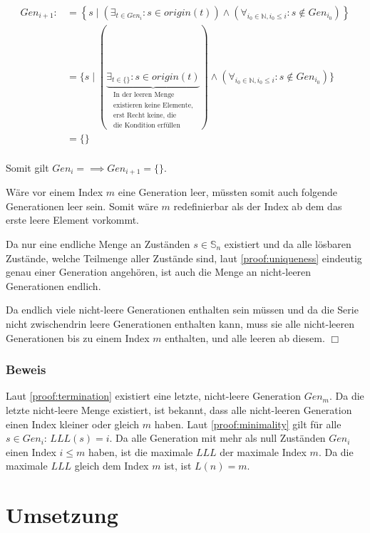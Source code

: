 \documentclass[a4paper,10pt,ngerman]{scrartcl}
\begin{document}
\begin{align*}
    Gen_{i+1} :&= \left\{ s \mid \left(\exists_{t \in Gen_i} : s \in origin(t)\right) \land \left(\forall_{i_0\in\mathbb{N}, i_0 \leq i}: s \notin Gen_{i_0}\right) \right\} \\
    & = \{ s \mid (\underbrace{\exists_{t \in \{\}} : s \in origin(t)}_{\substack{\text{In der leeren Menge}\\\text{existieren keine Elemente,}\\\text{erst Recht keine, die}\\\text{die Kondition erfüllen}}}) \land (\forall_{i_0\in\mathbb{N}, i_0 \leq i}: s \notin Gen_{i_0}) \} \\
    & = \{\} \\
\end{align*}

Somit gilt \(Gen_i = {} \implies Gen_{i+1} = \{\}\).

Wäre vor einem Index \(m\) eine Generation leer, müssten somit auch folgende Generationen leer sein. Somit wäre \(m\) redefinierbar als der Index ab dem das erste leere Element vorkommt.

Da nur eine endliche Menge an Zuständen \(s \in \mathbb{S}_n\) existiert und da alle lösbaren Zustände, welche Teilmenge aller Zustände sind, laut \cref{proof:uniqueness} eindeutig genau einer Generation angehören, ist auch die Menge an nicht-leeren Generationen endlich.

Da endlich viele nicht-leere Generationen enthalten sein müssen und da die Serie nicht zwischendrin leere Generationen enthalten kann, muss sie alle nicht-leeren Generationen bis zu einem Index \(m\) enthalten, und alle leeren ab diesem. \(\Box\)

\subsubsection{Beweis}

Laut \cref{proof:termination} existiert eine letzte, nicht-leere Generation \(Gen_m\).
Da die letzte nicht-leere Menge existiert, ist bekannt, dass alle nicht-leeren Generation einen Index kleiner oder gleich \(m\) haben.
Laut \cref{proof:minimality} gilt für alle \(s \in Gen_i\): \(LLL(s) = i\).
Da alle Generation mit mehr als null Zuständen \(Gen_i\) einen Index \(i \leq m\) haben, ist die maximale \(LLL\) der maximale Index \(m\).
Da die maximale \(LLL\) gleich dem Index \(m\) ist, ist \(L(n) = m\).

\section{Umsetzung}
\end{document}
